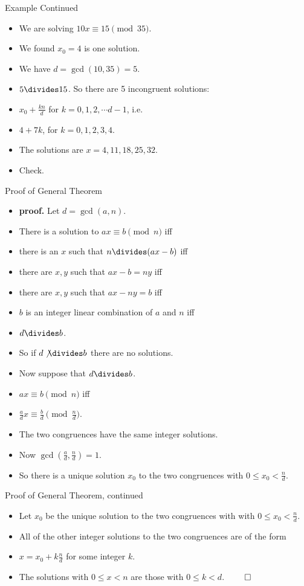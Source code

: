 \documentclass{beamer}
\begin{document}
\begin{frame}{Example Continued}
\begin{itemize}
  \item We are solving $10x \equiv 15 \pmod {35}$.
  \item We found $x_0=4$ is one solution.
  \item We have $d=\gcd(10,35) = 5$.
  \item $5\divides 15$. So there are 5 incongruent solutions:
  \item $x_0 + \frac{kn}{d}$ for $k=0,1,2,\cdots d-1$, i.e.
  \item $4 + 7k$, for $k=0,1,2,3,4$.
  \item The solutions are $x=4,11,18,25,32$.
  \item Check.
\end{itemize}
\end{frame}

\begin{frame}{Proof of General Theorem}
\begin{itemize}
  \item \textbf{proof.} Let $d=\gcd(a,n)$.
  \item There is a solution to $ax\equiv b \pmod n$ iff
  \item there is an $x$ such that $n\divides (ax - b)$ iff
  \item there are $x,y$ such that $ax-b = ny$ iff
  \item there are $x,y$ such that $ax - ny = b$ iff
  \item $b$ is an integer linear combination of $a$ and $n$ iff
  \item $d\divides b$.
  \item So if $d\not\divides b$ there are no solutions.
  \item Now suppose that $d\divides b$.
  \item $ax\equiv b \pmod n$ iff
  \item $\frac{a}{d}x \equiv \frac{b}{d} \pmod {\frac{n}{d}}$.
  \item The two congruences have the same integer solutions.
  \item Now $\gcd(\frac{a}{d},\frac{n}{d}) = 1$.
  \item So there is a unique solution $x_0$ to the two congruences with
  $0\leq x_0 < \frac{n}{d}$.
\end{itemize}
\end{frame}

\begin{frame}{Proof of General Theorem, continued}
\begin{itemize}
  \item Let $x_0$ be the unique solution to the two congruences with
 with $0\leq x_0 < \frac{n}{d}$.
  \item All of the other integer solutions to the two congruences are of the form
  \item $x=x_0+k\frac{n}{d}$ for some integer $k$.
  \item The solutions with $0\leq x < n$ are those with $0\leq k < d$. $\qed$
\end{itemize}
\end{frame}
\end{document}
